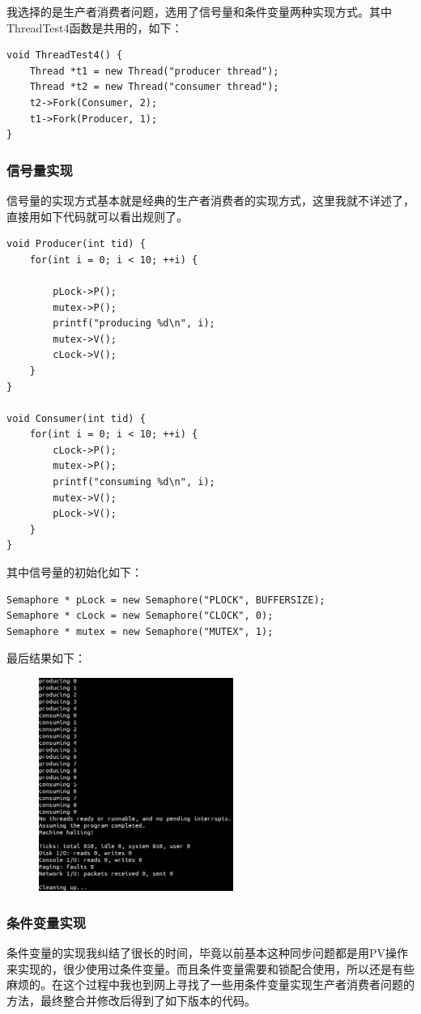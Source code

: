 \documentclass[nofonts]{ctexart}
\begin{document}
我选择的是生产者消费者问题，选用了信号量和条件变量两种实现方式。其中ThreadTest4函数是共用的，如下：
\begin{lstlisting}
void ThreadTest4() {
    Thread *t1 = new Thread("producer thread");
    Thread *t2 = new Thread("consumer thread");
    t2->Fork(Consumer, 2);
    t1->Fork(Producer, 1);
}
\end{lstlisting}

\subsubsection*{信号量实现}
信号量的实现方式基本就是经典的生产者消费者的实现方式，这里我就不详述了，直接用如下代码就可以看出规则了。
\begin{lstlisting}
void Producer(int tid) {
    for(int i = 0; i < 10; ++i) {

        pLock->P();
        mutex->P();
        printf("producing %d\n", i);
        mutex->V();
        cLock->V();
    }
}

void Consumer(int tid) {
    for(int i = 0; i < 10; ++i) {
        cLock->P();
        mutex->P();
        printf("consuming %d\n", i);
        mutex->V();
        pLock->V();
    }
}
\end{lstlisting}
其中信号量的初始化如下：
\begin{lstlisting}
Semaphore * pLock = new Semaphore("PLOCK", BUFFERSIZE);
Semaphore * cLock = new Semaphore("CLOCK", 0);
Semaphore * mutex = new Semaphore("MUTEX", 1);
\end{lstlisting}
最后结果如下：
\begin{figure}[h!]
\includegraphics[width=2.5in]{e30.png}
\end{figure}

\subsubsection*{条件变量实现}
条件变量的实现我纠结了很长的时间，毕竟以前基本这种同步问题都是用PV操作来实现的，很少使用过条件变量。而且条件变量需要和锁配合使用，所以还是有些麻烦的。在这个过程中我也到网上寻找了一些用条件变量实现生产者消费者问题的方法，最终整合并修改后得到了如下版本的代码。
\end{document}
